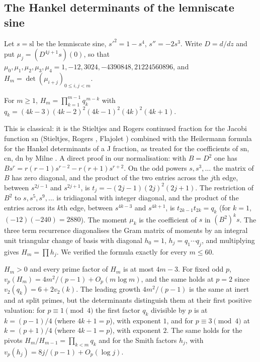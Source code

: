 \subsection{The Hankel determinants of the lemniscate sine}\label{mqg:sec:hankel}

Let $s=\mathrm{sl}$ be the lemniscate sine, $s'^2=1-s^4$, $s''=-2s^3$. Write $D=d/dz$ and put $\mu_j=(D^{4j+1}s)(0)$, so that $\mu_0,\mu_1,\mu_2,\mu_3,\mu_4=1,-12,3024,-4390848,21224560896$, and $H_m=\det(\mu_{i+j})_{0\le i,j<m}$.

\begin{theorem}\label{mqg:thm:hankel}
For $m\ge1$, $H_m=\prod_{k=1}^{m-1}q_k^{\,m-k}$ with $q_k=(4k-3)(4k-2)^2(4k-1)^2(4k)^2(4k+1)$.
\end{theorem}

This is classical: it is the Stieltjes and Rogers continued fraction for the Jacobi function $\mathrm{sn}$ (Stieltjes, Rogers \cite{Rogers07}, Flajolet \cite{Flajolet80}) combined with the Heilermann formula for the Hankel determinants of a J fraction, as treated for the coefficients of $\mathrm{sn}$, $\mathrm{cn}$, $\mathrm{dn}$ by Milne \cite{Milne02}. A direct proof in our normalisation: with $B=D^2$ one has $Bs^r=r(r-1)s^{r-2}-r(r+1)s^{r+2}$. On the odd powers $s,s^3,\dots$ the matrix of $B$ has zero diagonal, and the product of the two entries across the $j$th edge, between $s^{2j-1}$ and $s^{2j+1}$, is $t_j=-(2j-1)(2j)^2(2j+1)$. The restriction of $B^2$ to $s,s^5,s^9,\dots$ is tridiagonal with integer diagonal, and the product of the entries across its $k$th edge, between $s^{4k-3}$ and $s^{4k+1}$, is $t_{2k-1}t_{2k}=q_k$ (for $k=1$, $(-12)(-240)=2880$). The moment $\mu_k$ is the coefficient of $s$ in $(B^2)^ks$. The three term recurrence diagonalises the Gram matrix of moments by an integral unit triangular change of basis with diagonal $h_0=1$, $h_j=q_1\cdots q_j$, and multiplying gives $H_m=\prod h_j$. We verified the formula exactly for every $m\le60$.

\begin{corollary}\label{mqg:cor:sym}
$H_m>0$ and every prime factor of $H_m$ is at most $4m-3$. For fixed odd $p$, $v_p(H_m)=4m^2/(p-1)+O_p(m\log m)$, and the same holds at $p=2$ since $v_2(q_k)=6+2v_2(k)$. The leading growth $4m^2/(p-1)$ is the same at inert and at split primes, but the determinants distinguish them at their first positive valuation: for $p\equiv1\pmod4$ the first factor $q_k$ divisible by $p$ is at $k=(p-1)/4$ (where $4k+1=p$), with exponent $1$, and for $p\equiv3\pmod4$ at $k=(p+1)/4$ (where $4k-1=p$), with exponent $2$. The same holds for the pivots $H_m/H_{m-1}=\prod_{k<m}q_k$ and for the Smith factors $h_j$, with $v_p(h_j)=8j/(p-1)+O_p(\log j)$.
\end{corollary}

